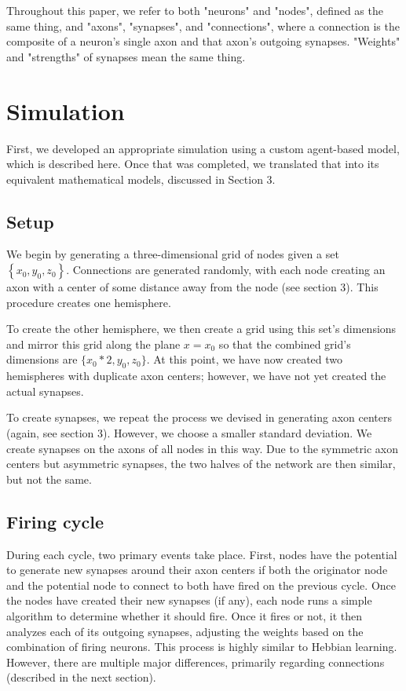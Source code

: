 \documentclass[12pt]{article}
\begin{document}
Throughout this paper, we refer to both "neurons" and "nodes", defined as the same thing, and "axons", "synapses", and "connections", where a connection is the composite of a neuron's single axon and that axon's outgoing synapses.  "Weights" and "strengths" of synapses mean the same thing.

\newpage

\section{Simulation} \label{simulation}

First, we developed an appropriate simulation using a custom agent-based model, which is described here.  Once that was completed, we translated that into its equivalent mathematical models, discussed in Section 3.

\subsection{Setup} \label{setup}

We begin by generating a three-dimensional grid of nodes given a set $\left\{x_0, y_0, z_0\right\}$.  Connections are generated randomly, with each node creating an axon with a center of some distance away from the node (see section 3).  This procedure creates one hemisphere.

To create the other hemisphere, we then create a grid using this set's dimensions and mirror this grid along the plane $x = x_0$ so that the combined grid's dimensions are $\{x_0 * 2, y_0, z_0\}$.  At this point, we have now created two hemispheres with duplicate axon centers; however, we have not yet created the actual synapses.

To create synapses, we repeat the process we devised in generating axon centers (again, see section 3).  However, we choose a smaller standard deviation.  We create synapses on the axons of all nodes in this way.  Due to the symmetric axon centers but asymmetric synapses, the two halves of the network are then similar, but not the same.

\subsection{Firing cycle} \label{cycle}

During each cycle, two primary events take place.  First, nodes have the potential to generate new synapses around their axon centers if both the originator node and the potential node to connect to both have fired on the previous cycle.  Once the nodes have created their new synapses (if any), each node runs a simple algorithm to determine whether it should fire.  Once it fires or not, it then analyzes each of its outgoing synapses, adjusting the weights based on the combination of firing neurons.  This process is highly similar to Hebbian learning.  However, there are multiple major differences, primarily regarding connections (described in the next section).
\end{document}
